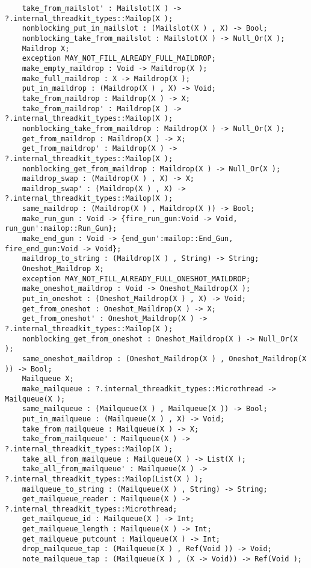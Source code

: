 \begin{verbatim}
    take_from_mailslot' : Mailslot(X ) -> ?.internal_threadkit_types::Mailop(X );
    nonblocking_put_in_mailslot : (Mailslot(X ) , X) -> Bool;
    nonblocking_take_from_mailslot : Mailslot(X ) -> Null_Or(X );
    Maildrop X;
    exception MAY_NOT_FILL_ALREADY_FULL_MAILDROP;
    make_empty_maildrop : Void -> Maildrop(X );
    make_full_maildrop : X -> Maildrop(X );
    put_in_maildrop : (Maildrop(X ) , X) -> Void;
    take_from_maildrop : Maildrop(X ) -> X;
    take_from_maildrop' : Maildrop(X ) -> ?.internal_threadkit_types::Mailop(X );
    nonblocking_take_from_maildrop : Maildrop(X ) -> Null_Or(X );
    get_from_maildrop : Maildrop(X ) -> X;
    get_from_maildrop' : Maildrop(X ) -> ?.internal_threadkit_types::Mailop(X );
    nonblocking_get_from_maildrop : Maildrop(X ) -> Null_Or(X );
    maildrop_swap : (Maildrop(X ) , X) -> X;
    maildrop_swap' : (Maildrop(X ) , X) -> ?.internal_threadkit_types::Mailop(X );
    same_maildrop : (Maildrop(X ) , Maildrop(X )) -> Bool;
    make_run_gun : Void -> {fire_run_gun:Void -> Void, run_gun':mailop::Run_Gun};
    make_end_gun : Void -> {end_gun':mailop::End_Gun, fire_end_gun:Void -> Void};
    maildrop_to_string : (Maildrop(X ) , String) -> String;
    Oneshot_Maildrop X;
    exception MAY_NOT_FILL_ALREADY_FULL_ONESHOT_MAILDROP;
    make_oneshot_maildrop : Void -> Oneshot_Maildrop(X );
    put_in_oneshot : (Oneshot_Maildrop(X ) , X) -> Void;
    get_from_oneshot : Oneshot_Maildrop(X ) -> X;
    get_from_oneshot' : Oneshot_Maildrop(X ) -> ?.internal_threadkit_types::Mailop(X );
    nonblocking_get_from_oneshot : Oneshot_Maildrop(X ) -> Null_Or(X );
    same_oneshot_maildrop : (Oneshot_Maildrop(X ) , Oneshot_Maildrop(X )) -> Bool;
    Mailqueue X;
    make_mailqueue : ?.internal_threadkit_types::Microthread -> Mailqueue(X );
    same_mailqueue : (Mailqueue(X ) , Mailqueue(X )) -> Bool;
    put_in_mailqueue : (Mailqueue(X ) , X) -> Void;
    take_from_mailqueue : Mailqueue(X ) -> X;
    take_from_mailqueue' : Mailqueue(X ) -> ?.internal_threadkit_types::Mailop(X );
    take_all_from_mailqueue : Mailqueue(X ) -> List(X );
    take_all_from_mailqueue' : Mailqueue(X ) -> ?.internal_threadkit_types::Mailop(List(X ) );
    mailqueue_to_string : (Mailqueue(X ) , String) -> String;
    get_mailqueue_reader : Mailqueue(X ) -> ?.internal_threadkit_types::Microthread;
    get_mailqueue_id : Mailqueue(X ) -> Int;
    get_mailqueue_length : Mailqueue(X ) -> Int;
    get_mailqueue_putcount : Mailqueue(X ) -> Int;
    drop_mailqueue_tap : (Mailqueue(X ) , Ref(Void )) -> Void;
    note_mailqueue_tap : (Mailqueue(X ) , (X -> Void)) -> Ref(Void );

\end{verbatim}
